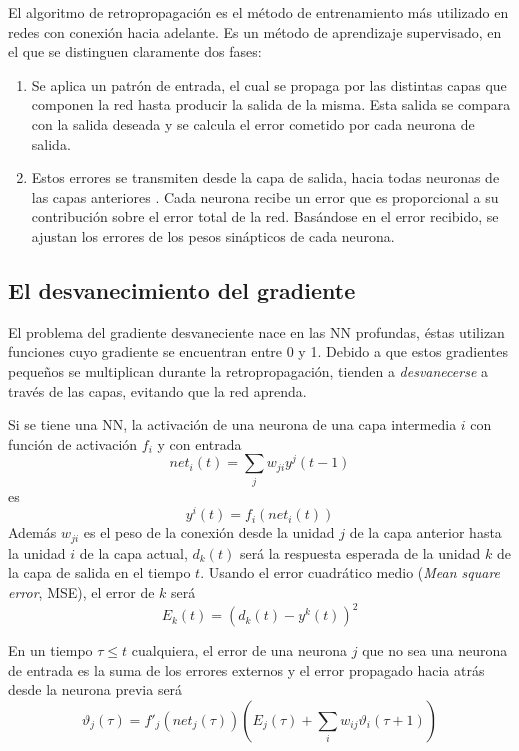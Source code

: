 El algoritmo de retropropagación es el método de entrenamiento más utilizado en redes con conexión hacia adelante. Es un método de aprendizaje supervisado, en el que se distinguen claramente dos fases:
\begin{enumerate}
	\item Se aplica un patrón de entrada, el cual se propaga por las distintas capas que componen la red hasta producir la salida de la misma. Esta salida se compara con la salida deseada y se calcula el error cometido por cada neurona de salida.

	\item Estos errores se transmiten desde la capa de salida, hacia todas neuronas de las capas anteriores \cite{Fritsch1996}. Cada neurona recibe un error que es proporcional a su contribución sobre el error total de la red. Basándose en el error recibido, se ajustan los errores de los pesos sinápticos de cada neurona.
\end{enumerate}


\subsection{El desvanecimiento del gradiente}\label{sec:desvanecimiento_del_gradiente}
El problema del gradiente desvaneciente nace en las NN profundas, éstas utilizan funciones cuyo gradiente se encuentran entre 0 y 1. Debido a que estos gradientes pequeños se multiplican durante la retropropagación, tienden a {\em desvanecerse} a través de las capas, evitando que la red aprenda.

Si se tiene una NN, la activación de una neurona de una capa intermedia $i$ con función de activación $f_i$ y con entrada $$ net_{i}(t) = \sum_{j}w_{ji}y^{j}(t - 1) $$ es $$y^{i}(t) = f_{i}(net_{i}(t))$$ Además $w_{ji}$ es el peso de la conexión desde la unidad $j$ de la capa anterior hasta la unidad $i$ de la capa actual, $d_{k}(t)$ será la respuesta esperada de la unidad $k$ de la capa de salida en el tiempo $t$. Usando el error cuadrático medio ({\em Mean square error}, MSE), el error de $k$ será
$$ E_{k}(t) = (d_{k}(t) - y^{k}(t))^2 $$

En un tiempo $\tau \leq t$ cualquiera, el error de una neurona $j$ que no sea una neurona de entrada es la suma de los errores externos y el error propagado hacia atrás desde la neurona previa será
$$ \vartheta_{j}(\tau) = f'_{j}(net_{j}(\tau))\left(E_{j}(\tau) + \sum_{i} w_{ij}\vartheta_{i}(\tau + 1)\right) $$

